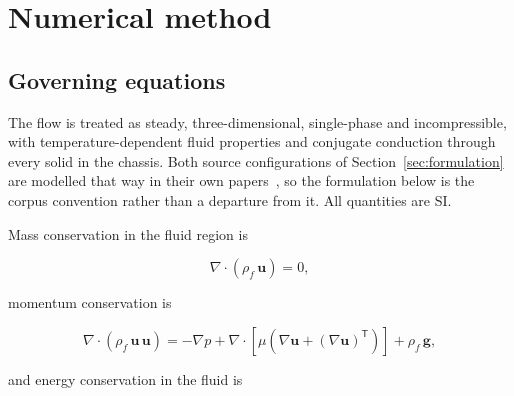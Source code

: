 %
%

\section{Numerical method}
\label{sec:method}

\subsection{Governing equations}
\label{sec:governing}

The flow is treated as steady, three-dimensional, single-phase and incompressible, with
temperature-dependent fluid properties and conjugate conduction through every solid in the
chassis. Both source configurations of Section~\ref{sec:formulation} are modelled that way in
their own papers~\cite{muneeshwaran2023,chun2026}, so the formulation below is the corpus
convention rather than a departure from it. All quantities are SI.

Mass conservation in the fluid region is

\begin{equation}
\nabla \cdot \left( \rho_f \, \mathbf{u} \right) = 0 ,
\label{eq:continuity}
\end{equation}

\noindent
momentum conservation is

\begin{equation}
\nabla \cdot \left( \rho_f \, \mathbf{u}\,\mathbf{u} \right)
= -\nabla p
+ \nabla \cdot \left[ \mu \left( \nabla\mathbf{u} + \left(\nabla\mathbf{u}\right)^{\mathsf{T}}
\right) \right]
+ \rho_f \, \mathbf{g} ,
\label{eq:momentum}
\end{equation}

\noindent
and energy conservation in the fluid is

